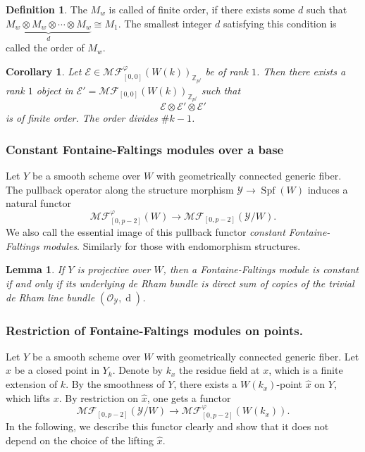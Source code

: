 \documentclass[12pt,twoside]{book}
\theoremstyle{plain}
\newtheorem{lemma}[lemma]{Lemma}
\newtheorem{corollary}[corollary]{Corollary}
\theoremstyle{definition}
\newtheorem{definition}[definition]{Definition}
\theoremstyle{remark}
\newcommand{\bZ}{{\mathbb Z}}
\newcommand{\mE}{{\mathcal E}}
\newcommand{\mO}{{\mathcal O}}
\newcommand{\mY}{{\mathcal Y}}
\DeclareMathOperator\rmd{d}
\DeclareMathOperator\Spf{Spf}
\newcommand{\MF}{\mathcal{MF}}
\numberwithin{equation}{section}
\begin{document}
\begin{definition}
The $M_w$ is called of finite order, if there exists some $d$ such that $\underbrace{M_w \otimes M_w \otimes \cdots \otimes M_w}_{d} \cong M_1$. The smallest integer $d$ satisfying this condition is called the order of $M_w$.
\end{definition}

\begin{corollary} Let $\mE\in \MF^{\varphi}_{[0,0]}(W(k))_{\bZ_{p^f}}$ be of rank $1$. Then there exists a rank $1$ object in $\mE'=\MF_{[0,0]}(W(k))_{\bZ_{p^f}}$ such that
\[\mE\otimes \mE'\otimes \mE'\]
is of finite order. The order divides $\#k-1$.
\end{corollary}


\subsubsection{Constant Fontaine-Faltings modules over a base}
Let $Y$ be a smooth scheme over $W$ with geometrically connected generic fiber. The pullback operator along the structure morphism $\mY\rightarrow \Spf(W)$ induces a natural functor
\[\MF_{[0,p-2]}^{\varphi}(W) \rightarrow \MF_{[0,p-2]}(\mY/W).\]
We also call the essential image of this pullback functor \emph{constant Fontaine-Faltings modules}. Similarly for those with endomorphism structures.

\begin{lemma}
If $Y$ is projective over $W$, then a Fontaine-Faltings module is constant if and only if its underlying de Rham bundle is direct sum of copies of the trivial de Rham line bundle $(\mO_{\mY},\rmd)$.
\end{lemma}


\subsubsection{Restriction of Fontaine-Faltings modules on points.}

Let $Y$ be a smooth scheme over $W$ with geometrically connected generic fiber. Let $x$ be a closed point in $Y_k$. Denote by $k_x$ the residue field at $x$, which is a finite extension of $k$. By the smoothness of $Y$, there exists a $W(k_x)$-point $\widehat{x}$ on $Y$, which lifts $x$. By restriction on $\widehat{x}$, one gets a functor
\[\MF_{[0,p-2]}(\mY/W) \rightarrow \MF_{[0,p-2]}^{\varphi}(W(k_x)).\]
In the following, we describe this functor clearly and show that it does not depend on the choice of the lifting $\widehat{x}$.
\end{document}
